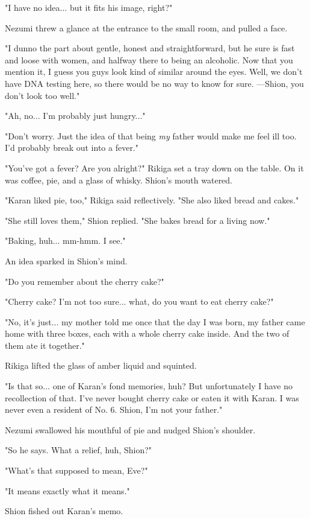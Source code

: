 "I have no idea... but it fits his image, right?"

Nezumi threw a glance at the entrance to the small room, and pulled a
face.

"I dunno the part about gentle, honest and straightforward, but he sure
is fast and loose with women, and halfway there to being an alcoholic.
Now that you mention it, I guess you guys look kind of similar around
the eyes. Well, we don't have DNA testing here, so there would be no way
to know for sure. ---Shion, you don't look too well."

"Ah, no... I'm probably just hungry..."

"Don't worry. Just the idea of that being \emph{my} father would make me feel
ill too. I'd probably break out into a fever."

"You've got a fever? Are you alright?" Rikiga set a tray down on the
table. On it was coffee, pie, and a glass of whisky. Shion's mouth
watered.

"Karan liked pie, too," Rikiga said reflectively. "She also liked bread
and cakes."

"She still loves them," Shion replied. "She bakes bread for a living
now."

"Baking, huh... mm-hmm. I see."

An idea sparked in Shion's mind.

"Do you remember about the cherry cake?"

"Cherry cake? I'm not too sure... what, do you want to eat cherry cake?"

"No, it's just... my mother told me once that the day I was born, my
father came home with three boxes, each with a whole cherry cake inside.
And the two of them ate it together."

Rikiga lifted the glass of amber liquid and squinted.

"Is that so... one of Karan's fond memories, huh? But unfortunately I
have no recollection of that. I've never bought cherry cake or eaten it
with Karan. I was never even a resident of No. 6. Shion, I'm not your
father."

Nezumi swallowed his mouthful of pie and nudged Shion's shoulder.

"So he says. What a relief, huh, Shion?"

"What's that supposed to mean, Eve?"

"It means exactly what it means."

Shion fished out Karan's memo.


